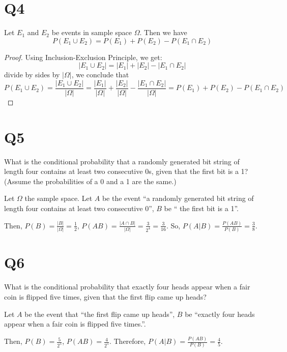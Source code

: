 \documentclass[11pt]{article}
\begin{document}
\section*{Q4}
Let $E_1$ and $E_2$ be events in sample space $\Omega$. Then 
we have
\begin{equation*}
  P(E_1 \cup E_2)=P(E_1)+P(E_2)-P(E_1\cap E_2)
\end{equation*}
\begin{proof}
    Using Inclusion-Exclusion Principle, we get:
    \begin{equation*}
      \left\vert E_1\cup E_2 \right\vert =
      \left\vert E_1 \right\vert +\left\vert E_2 \right\vert -
      \left\vert E_1 \cap E_2 \right\vert 
    \end{equation*}
    divide by sides by $\left\vert \Omega \right\vert $, we conclude that 
    \begin{equation*}
        P(E_1\cup E_2)=\frac{\left\vert E_1\cup E_2 \right\vert }{\left\vert \Omega \right\vert }=
        \frac{\left\vert E_1 \right\vert }{\left\vert \Omega \right\vert }
        +\frac{\left\vert E_2   \right\vert }{\left\vert \Omega \right\vert }
        -\frac{\left\vert E_1 \cap E_2 \right\vert }{\left\vert \Omega \right\vert }
        =P(E_1)+P(E_2)-P(E_1\cap E_2)
    \end{equation*}
\end{proof}

\section*{Q5}
What is the conditional probability that a randomly generated
bit string of length four contains at least two consecutive 0s,
given that the ﬁrst bit is a 1? (Assume the probabilities of a 0
and a 1 are the same.)
\begin{solution}
    Let $\Omega$ the sample space. Let $A$ be the event ``a randomly generated bit string of length four contains at least two consecutive 0'', $B$ be `` the first bit is a 1''.

    Then, 
    $P(B)=\frac{\left\vert B \right\vert }{\left\vert \Omega \right\vert }=\frac{1}{2}$, 
    $P(AB)=\frac{\left\vert A \cap B \right\vert }{\left\vert \Omega \right\vert }=\frac{3}{2^{4}}=\frac{3}{16}$.
    So, $P(A \vert B)=\frac{P(AB)}{P(B)}=\frac{3}{8}$.

\end{solution}

\section*{Q6}
What is the conditional probability that exactly four heads
appear when a fair coin is ﬂipped ﬁve times, given that the
ﬁrst ﬂip came up heads?
\begin{solution}
    Let $A$ be the event that 
    ``the ﬁrst ﬂip came up heads'', 
    $B$ be ``exactly four heads appear when a fair 
    coin is flipped five times.''.

    Then, $P(B)=\frac{5}{2^{5}}$, $P(AB)=\frac{4}{2^{5}}$. Therefore,
    $P(A \vert B)=\frac{P(AB)}{P(B)}=\frac{4}{5}$.
\end{solution}
\end{document}

